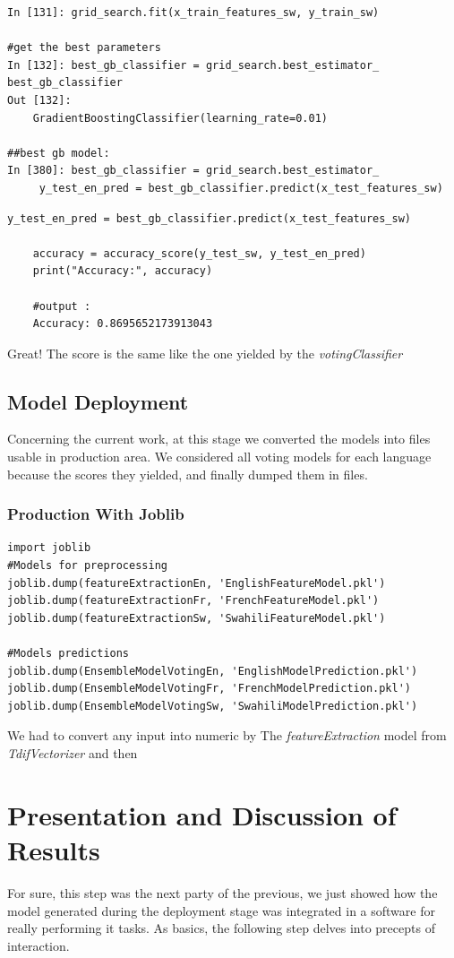 \documentclass[12pt,a4paper, oneside]{book}
\begin{document}
\begin{lstlisting}[style=stylejupyter]
In [131]: grid_search.fit(x_train_features_sw, y_train_sw) 

#get the best parameters 
In [132]: best_gb_classifier = grid_search.best_estimator_ 
best_gb_classifier
Out [132]: 
	GradientBoostingClassifier(learning_rate=0.01) 
	
##best gb model:
In [380]: best_gb_classifier = grid_search.best_estimator_ 
     y_test_en_pred = best_gb_classifier.predict(x_test_features_sw)
\end{lstlisting} 

\begin{lstlisting}[style=stylejupyter]
	y_test_en_pred = best_gb_classifier.predict(x_test_features_sw)
	
	accuracy = accuracy_score(y_test_sw, y_test_en_pred)
	print("Accuracy:", accuracy) 
	
	#output : 
	Accuracy: 0.8695652173913043
\end{lstlisting}
Great! The score is the same like the one yielded by the \textit{votingClassifier}  

\subsection{Model Deployment}
Concerning the current work, at this stage we converted the models into files usable in production area. We considered all voting models for each language because the scores they yielded, and finally dumped them in files.
\subsubsection{Production With Joblib}
\begin{lstlisting}[style=stylejupyter]
import joblib
#Models for preprocessing
joblib.dump(featureExtractionEn, 'EnglishFeatureModel.pkl')
joblib.dump(featureExtractionFr, 'FrenchFeatureModel.pkl')
joblib.dump(featureExtractionSw, 'SwahiliFeatureModel.pkl') 

#Models predictions
joblib.dump(EnsembleModelVotingEn, 'EnglishModelPrediction.pkl')
joblib.dump(EnsembleModelVotingFr, 'FrenchModelPrediction.pkl')
joblib.dump(EnsembleModelVotingSw, 'SwahiliModelPrediction.pkl')
\end{lstlisting} 
We had to convert any input into numeric by The \textit{featureExtraction} model from \textit{TdifVectorizer} and then 

\section{Presentation and Discussion of Results} 
For sure, this step was the next party of the previous, we just showed how the model generated during the deployment stage was integrated in a software for really performing it tasks. As basics, the following step delves into precepts of interaction. 
\end{document}
